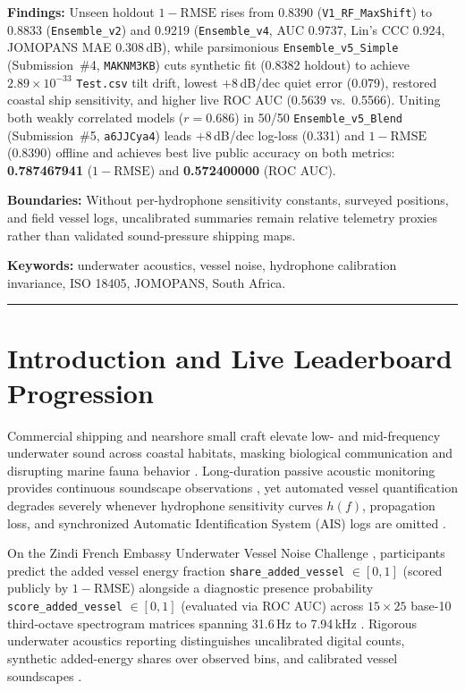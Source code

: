 \documentclass[10pt,a4paper]{article}
\begin{document}
\noindent\textbf{Findings:} Unseen holdout $1-\mathrm{RMSE}$ rises from 0.8390 (\texttt{V1\_RF\_MaxShift}) to 0.8833 (\texttt{Ensemble\_v2}) and 0.9219 (\texttt{Ensemble\_v4}, AUC 0.9737, Lin's CCC 0.924, JOMOPANS MAE 0.308\,dB), while parsimonious \texttt{Ensemble\_v5\_Simple} (Submission~\#4, \texttt{MAKNM3KB}) cuts synthetic fit (0.8382 holdout) to achieve $2.89\times 10^{-33}$ \texttt{Test.csv} tilt drift, lowest $+8$\,dB/dec quiet error (0.079), restored coastal ship sensitivity, and higher live ROC AUC (0.5639 vs.\ 0.5566). Uniting both weakly correlated models ($r=0.686$) in 50/50 \texttt{Ensemble\_v5\_Blend} (Submission~\#5, \texttt{a6JJCya4}) leads $+8$\,dB/dec log-loss (0.331) and $1-\mathrm{RMSE}$ (0.8390) offline and achieves best live public accuracy on both metrics: \textbf{0.787467941} ($1-\mathrm{RMSE}$) and \textbf{0.572400000} (ROC AUC).

\noindent\textbf{Boundaries:} Without per-hydrophone sensitivity constants, surveyed positions, and field vessel logs, uncalibrated summaries remain relative telemetry proxies rather than validated sound-pressure shipping maps.

\noindent\textbf{Keywords:} underwater acoustics, vessel noise, hydrophone calibration invariance, ISO 18405, JOMOPANS, South Africa.

\vspace{0.15em}
\noindent\rule{\textwidth}{0.5pt}

\section{Introduction and Live Leaderboard Progression}

Commercial shipping and nearshore small craft elevate low- and mid-frequency underwater sound across coastal habitats, masking biological communication and disrupting marine fauna behavior \parencite{duarte2021soundscape,wenz1962ambient}. Long-duration passive acoustic monitoring provides continuous soundscape observations \parencite{merchant2015measuring}, yet automated vessel quantification degrades severely whenever hydrophone sensitivity curves $h(f)$, propagation loss, and synchronized Automatic Identification System (AIS) logs are omitted \parencite{iso2017underwater,robinson2014npl}.

On the Zindi French Embassy Underwater Vessel Noise Challenge \parencite{zindi2026challenge,zindi2026rules}, participants predict the added vessel energy fraction \texttt{share\_added\_vessel} $\in [0,1]$ (scored publicly by $1-\mathrm{RMSE}$) alongside a diagnostic presence probability \texttt{score\_added\_vessel} $\in [0,1]$ (evaluated via ROC AUC) across $15 \times 25$ base-10 third-octave spectrogram matrices spanning 31.6\,Hz to 7.94\,kHz \parencite{iec2014bands}. Rigorous underwater acoustics reporting distinguishes uncalibrated digital counts, synthetic added-energy shares over observed bins, and calibrated vessel soundscapes \parencite{ainslie2020adeon,farcas2020shipping}.
\end{document}
